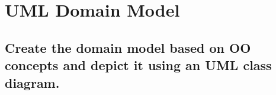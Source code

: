 \section{UML Domain Model}
		
		\subsection{Create the domain model based on OO concepts and depict it using an UML
			class diagram.}